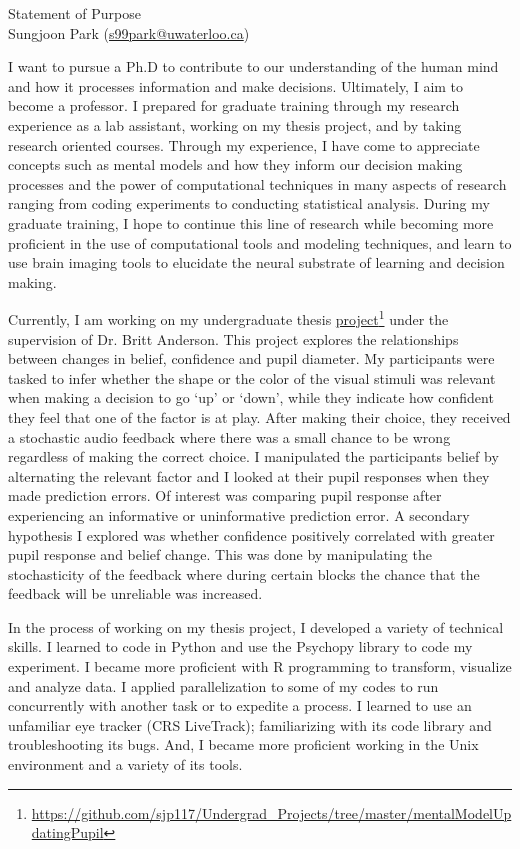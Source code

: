 \documentclass[12pt]{article}
\let\oldcenter\center
\let\oldendcenter\endcenter
\renewenvironment{center}{\setlength\topsep{-1pt}\oldcenter}{\oldendcenter}
\begin{document}
	
	\begin{center}
		{\Large Statement of Purpose} \\
		{\normalsize Sungjoon Park (\href{mailto:s99park@uwaterloo.ca}{s99park@uwaterloo.ca})}
	\end{center}
	
	I want to pursue a Ph.D to contribute to our understanding of the human mind and how it processes information and make decisions. Ultimately, I aim to become a professor. I prepared for graduate training through my research experience as a lab assistant, working on my thesis project, and by taking research oriented courses. Through my experience, I have come to appreciate concepts such as mental models and how they inform our decision making processes and the power of computational techniques in many aspects of research ranging from coding experiments to conducting statistical analysis. During my graduate training, I hope to continue this line of research while becoming more proficient in the use of computational tools and modeling techniques, and learn to use brain imaging tools to elucidate the neural substrate of learning and decision making.

	Currently, I am working on my undergraduate thesis \href{https://github.com/sjp117/Undergrad_Projects/tree/master/mentalModelUpdatingPupil}{project}\footnote{\url{https://github.com/sjp117/Undergrad\_Projects/tree/master/mentalModelUpdatingPupil}} under the supervision of Dr. Britt Anderson. This project explores the relationships between changes in belief, confidence and pupil diameter. My participants were tasked to infer whether the shape or the color of the visual stimuli was relevant when making a decision to go `up' or `down', while they indicate how confident they feel that one of the factor is at play. After making their choice, they received a stochastic audio feedback where there was a small chance to be wrong regardless of making the correct choice. I manipulated the participants belief by alternating the relevant factor and I looked at their pupil responses when they made prediction errors. Of interest was comparing pupil response after experiencing an informative or uninformative prediction error. A secondary hypothesis I explored was whether confidence positively correlated with greater pupil response and belief change. This was done by manipulating the stochasticity of the feedback where during certain blocks the chance that the feedback will be unreliable was increased.

	In the process of working on my thesis project, I developed a variety of technical skills. I learned to code in Python and use the Psychopy library to code my experiment. I became more proficient with R programming to transform, visualize and analyze data. I applied parallelization to some of my codes to run concurrently with another task or to expedite a process. I learned to use an unfamiliar eye tracker (CRS LiveTrack); familiarizing with its code library and troubleshooting its bugs. And, I became more proficient working in the Unix environment and a variety of its tools. 
\end{document}
